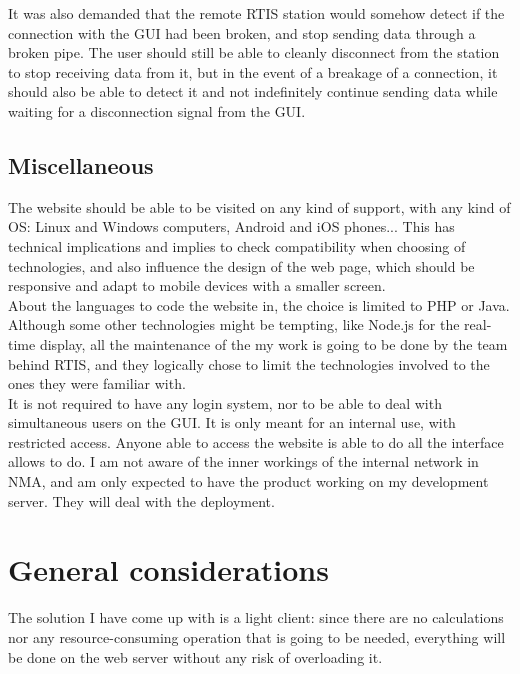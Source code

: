\documentclass{themeensg}
\begin{document}
It was also demanded that the remote RTIS station would somehow detect if the connection with the GUI had been broken, and stop sending data through a broken pipe. The user should still be able to cleanly disconnect from the station to stop receiving data from it, but in the event of a breakage of a connection, it should also be able to detect it and not indefinitely continue sending data while waiting for a disconnection signal from the GUI.

\subsection{Miscellaneous}
The website should be able to be visited on any kind of support, with any kind of OS: Linux and Windows computers, Android and iOS phones... This has technical implications and implies to check compatibility when choosing of technologies, and also influence the design of the web page, which should be responsive and adapt to mobile devices with a smaller screen.\\

About the languages to code the website in, the choice is limited to PHP or Java. Although some other  technologies might be tempting, like Node.js for the real-time display, all the maintenance of the my work is going to be done by the team behind RTIS, and they logically chose to limit the technologies involved to the ones they were familiar with.\\

It is not required to have any login system, nor to be able to deal with simultaneous users on the GUI. It is only meant for an internal use, with restricted access. Anyone able to access the website is able to do all the interface allows to do. I am not aware of the inner workings of the internal network in NMA, and am only expected to have the product working on my development server. They will deal with the deployment.

\section{General considerations}

The solution I have come up with is a light client: since there are no calculations nor any resource-consuming operation that is going to be needed, everything will be done on the web server without any risk of overloading it.\\
\end{document}
